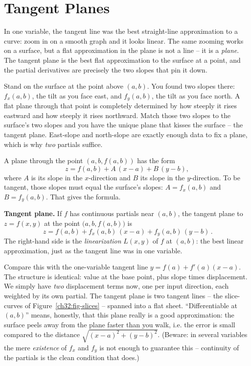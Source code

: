 \section{Tangent Planes}
\label{ch32:sec-tangent}

In one variable, the tangent line was the best straight-line approximation to a curve: zoom in
on a smooth graph and it looks linear. The same zooming works on a surface, but a flat
approximation in the plane is not a line -- it is a \emph{plane}. The tangent plane is the best
flat approximation to the surface at a point, and the partial derivatives are precisely the two
slopes that pin it down.

\begin{intuitionbox}
Stand on the surface at the point above $(a,b)$. You found two slopes there: $f_x(a,b)$, the
tilt as you face east, and $f_y(a,b)$, the tilt as you face north. A flat plane through that
point is completely determined by how steeply it rises eastward and how steeply it rises
northward. Match those two slopes to the surface's two slopes and you have the unique plane that
kisses the surface -- the tangent plane. East-slope and north-slope are exactly enough data to
fix a plane, which is why \emph{two} partials suffice.
\end{intuitionbox}

A plane through the point $(a,b,f(a,b))$ has the form
\[
   z = f(a,b) + A\,(x-a) + B\,(y-b),
\]
where $A$ is its slope in the $x$-direction and $B$ its slope in the $y$-direction. To be
tangent, those slopes must equal the surface's slopes: $A=f_x(a,b)$ and $B=f_y(a,b)$. That
gives the formula.

\begin{focusbox}
\textbf{Tangent plane.} If $f$ has continuous partials near $(a,b)$, the tangent plane to
$z=f(x,y)$ at the point $\big(a,b,f(a,b)\big)$ is
\[
   \boxed{\,z = f(a,b) + f_x(a,b)\,(x-a) + f_y(a,b)\,(y-b)\,}.
\]
The right-hand side is the \emph{linearization} $L(x,y)$ of $f$ at $(a,b)$: the best
linear approximation, just as the tangent line was in one variable.
\end{focusbox}

\begin{happeningbox}
Compare this with the one-variable tangent line $y = f(a) + f'(a)(x-a)$. The structure is
identical: value at the base point, plus slope times displacement. We simply have \emph{two}
displacement terms now, one per input direction, each weighted by its own partial. The tangent
plane is two tangent lines -- the slice-curves of Figure~\ref{ch32:fig-slices} -- spanned into a
flat sheet. ``Differentiable at $(a,b)$'' means, honestly, that this plane really is a good
approximation: the surface peels away from the plane faster than you walk, i.e. the error is
small compared to the distance $\sqrt{(x-a)^2+(y-b)^2}$. (Beware: in several variables the mere
\emph{existence} of $f_x$ and $f_y$ is not enough to guarantee this -- continuity of the partials
is the clean condition that does.)
\end{happeningbox}

